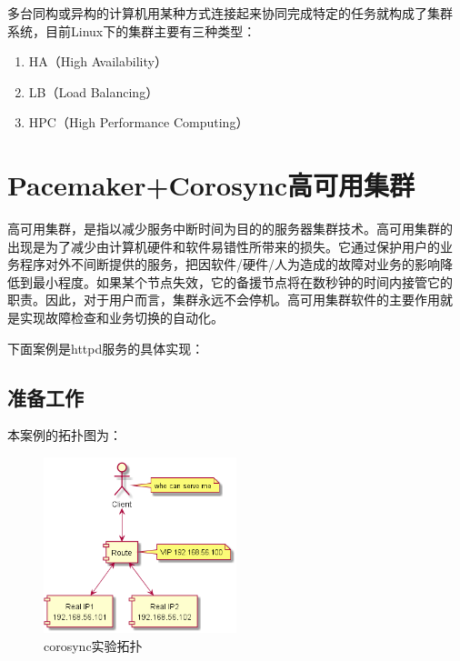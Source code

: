 多台同构或异构的计算机用某种方式连接起来协同完成特定的任务就构成了集群
系统，目前Linux下的集群主要有三种类型：

\begin{enumerate}[itemsep=0pt,parsep=0pt]
\item HA（High Availability）
\item LB（Load Balancing）
\item HPC（High Performance Computing）
\end{enumerate}









\chapter{Pacemaker+Corosync高可用集群}

高可用集群，是指以减少服务中断时间为目的的服务器集群技术。高可用集群的
出现是为了减少由计算机硬件和软件易错性所带来的损失。它通过保护用户的业
务程序对外不间断提供的服务，把因软件/硬件/人为造成的故障对业务的影响降
低到最小程度。如果某个节点失效，它的备援节点将在数秒钟的时间内接管它的
职责。因此，对于用户而言，集群永远不会停机。高可用集群软件的主要作用就
是实现故障检查和业务切换的自动化。

下面案例是httpd服务的具体实现：

\section{准备工作}

本案例的拓扑图为：

\begin{figure}[!htbp]
  \centering
  \includegraphics[width=0.5\textwidth]{img/web_topo.png}
  \caption{corosync实验拓扑}
\end{figure}

